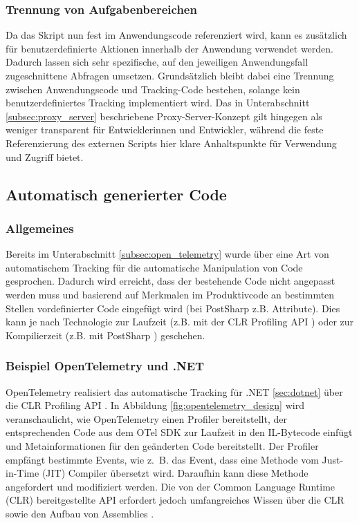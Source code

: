 \subsubsection{Trennung von Aufgabenbereichen}
Da das Skript nun fest im Anwendungscode referenziert wird, kann es zusätzlich für benutzerdefinierte Aktionen innerhalb der Anwendung verwendet werden. Dadurch lassen sich sehr spezifische, auf den jeweiligen Anwendungsfall zugeschnittene Abfragen umsetzen. Grundsätzlich bleibt dabei eine Trennung zwischen Anwendungscode und Tracking-Code bestehen, solange kein benutzerdefiniertes Tracking implementiert wird.  
Das in Unterabschnitt \ref{subsec:proxy_server} beschriebene Proxy-Server-Konzept gilt hingegen als weniger transparent für Entwicklerinnen und Entwickler, während die feste Referenzierung des externen Scripts hier klare Anhaltspunkte für Verwendung und Zugriff bietet.

\subsection{Automatisch generierter Code}
\label{subsec:autogenerated_code}

\subsubsection{Allgemeines}
Bereits im Unterabschnitt \ref{subsec:open_telemetry} wurde über eine Art von automatischem Tracking für die automatische Manipulation von Code gesprochen. Dadurch wird erreicht, dass der bestehende Code nicht angepasst werden muss und basierend auf Merkmalen im Produktivcode an bestimmten Stellen vordefinierter Code eingefügt wird (bei PostSharp z.B. Attribute). Dies kann je nach Technologie zur Laufzeit (z.B. mit der CLR Profiling API \cite{microsoft2025profiling}) oder zur Kompilierzeit (z.B. mit PostSharp \cite{postsharp-how-it-works}) geschehen.

\subsubsection{Beispiel OpenTelemetry und .NET}
OpenTelemetry realisiert das automatische Tracking für .NET \ref{sec:dotnet} über die CLR Profiling API \cite{microsoft2025profiling}. In Abbildung \ref{fig:opentelemetry_design} wird veranschaulicht, wie OpenTelemetry einen Profiler bereitstellt, der entsprechenden Code aus dem OTel SDK zur Laufzeit in den IL-Bytecode einfügt und Metainformationen für den geänderten Code bereitstellt. Der Profiler empfängt bestimmte Events, wie z.~B. das Event, dass eine Methode vom Just-in-Time (JIT) Compiler übersetzt wird. Daraufhin kann diese Methode angefordert und modifiziert werden. Die von der Common Language Runtime (CLR) bereitgestellte API erfordert jedoch umfangreiches Wissen über die CLR sowie den Aufbau von Assemblies \cite{Mikunov2003}.


